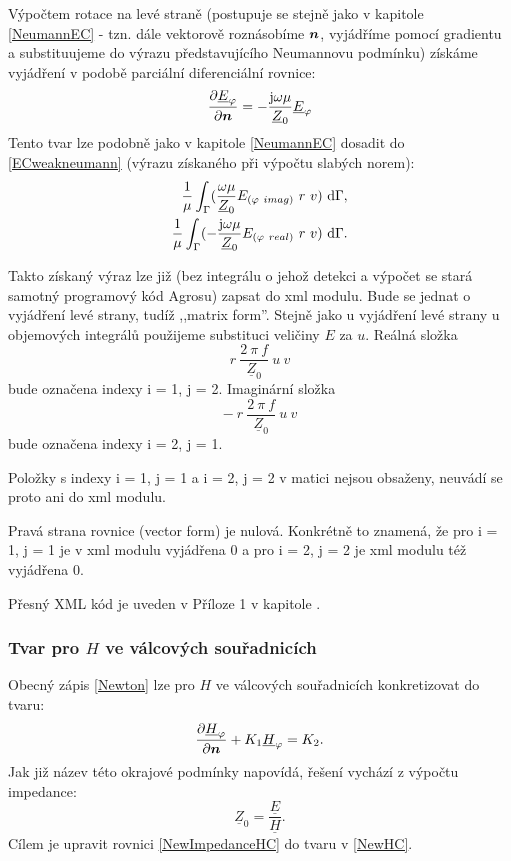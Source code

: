 \documentclass[12pt,a4paper,oneside]{article}
\numberwithin{equation}{section} %
\numberwithin{figure}{section} %
\numberwithin{table}{section} %
\newcommand{\mj}{\mathrm{j}} %
\renewcommand{\vec}[1]{\mbox{\boldmath$#1$}} %
\newcommand{\faz}[1]{{\underline{#1}}} %
\begin{document}
Výpočtem rotace na levé straně (postupuje se stejně jako v kapitole \ref{NeumannEC} - tzn. dále vektorově roznásobíme $\vec{n}$, vyjádříme pomocí gradientu a substituujeme do výrazu představujícího Neumannovu podmínku) získáme vyjádření v podobě parciální diferenciální rovnice:
\begin{equation}
\frac{\partial \faz{E} _{\varphi}}{\partial \vec{n}} = - \frac{\mj \omega \mu}{\faz{Z} _0} \faz{E} _{\varphi}
\end{equation}
Tento tvar lze podobně jako v kapitole \ref{NeumannEC} dosadit do \ref{ECweakneumann} (výrazu získaného při výpočtu slabých norem):
\begin{subequations}
\begin{align}
\frac{1}{\mu} \int _{\Gamma} ( \frac{\omega \mu}{\faz{Z} _0} E _{(\varphi ~ imag)} ~ r ~ v ) ~ \ud \Gamma ,
\\ 
\frac{1}{\mu} \int _{\Gamma} ( - \frac{\mj \omega \mu}{\faz{Z} _0} E _{(\varphi ~ real)} ~ r ~ v ) ~ \ud \Gamma .
\end{align}
\end{subequations}

Takto získaný výraz lze již (bez integrálu o jehož detekci a výpočet se stará samotný programový kód Agrosu) zapsat do xml modulu. Bude se jednat o vyjádření levé strany, tudíž ,,matrix form''. Stejně jako u vyjádření levé strany u objemových integrálů použijeme substituci veličiny $E$ za $u$. Reálná složka 
\begin{equation}
r ~\frac{2 ~ \pi ~ f}{\faz{Z} _0} ~ u ~ v
\end{equation} 
bude označena indexy i = 1, j = 2. Imaginární složka 
\begin{equation}
- ~ r ~ \frac{2 ~ \pi ~ f}{\faz{Z} _0} ~ u ~ v
\end{equation}
bude označena indexy i = 2, j = 1.

Položky s indexy i = 1, j = 1 a i = 2, j = 2 v matici nejsou obsaženy, neuvádí se proto ani do xml modulu.

Pravá strana rovnice (vector form) je nulová. Konkrétně to znamená, že pro i = 1, j = 1 je v xml modulu vyjádřena $0$ a pro i = 2, j = 2 je xml modulu též vyjádřena $0$.

Přesný XML kód je uveden v Příloze 1 v kapitole .



\subsubsection*{Tvar pro \faz{\vec{H}} ve válcových souřadnicích}
Obecný zápis \ref{Newton} lze pro \faz{\vec{H}} ve válcových souřadnicích konkretizovat do tvaru:
\begin{equation}
\label{NewHC}
\frac{\partial \faz{H} _{\varphi}}{\partial \vec{n}} + K_1 \faz{H} _{\varphi} = K_2 .
\end{equation}
Jak již název této okrajové podmínky napovídá, řešení vychází z výpočtu impedance: 
\begin{equation}
\label{NewImpedanceHC}
\faz{Z} _0 = \frac{\faz{E}}{\faz{H}} .
\end{equation}
Cílem je upravit rovnici \ref{NewImpedanceHC} do tvaru v \ref{NewHC}.
\end{document}
